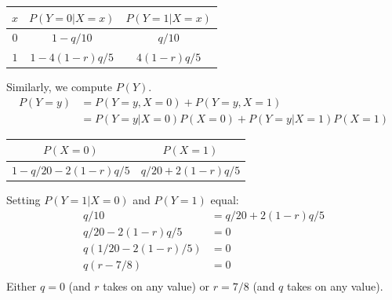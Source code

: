 \documentclass{article}
\begin{document}
\begin{center}
\begin{tabular}{|c|c|c|}
    \hline
    $x$ & $P(Y = 0 | X = x)$ & $P(Y = 1 | X = x)$ \\
    \hline
    $0$ & $1 - q/10$ & $q/10$ \\
    \hline
    $1$ & $1 - 4(1 - r)q/5$ & $4(1 - r)q/5$ \\
    \hline
\end{tabular}
\end{center}
Similarly, we compute $P(Y)$.
\begin{align*}
    P(Y = y) & = P(Y = y, X = 0) + P(Y = y, X = 1) \\
    & = P(Y = y | X = 0)P(X = 0) + P(Y = y | X = 1)P(X = 1)
\end{align*}
\begin{center}
\begin{tabular}{|c|c|}
    \hline
    $P(X = 0)$ & $P(X = 1)$ \\
    \hline
    $1 - q/20 - 2(1 - r)q/5$ & $q/20 + 2(1 - r)q/5$ \\
    \hline
\end{tabular}
\end{center}
Setting $P(Y = 1|X = 0)$ and $P(Y = 1)$ equal:
\begin{align*}
    q/10 & = q/20 + 2(1 - r)q/5 \\
    q/20 - 2(1 - r)q/5 & = 0 \\
    q(1/20 - 2(1 - r)/5) & = 0 \\
    q(r - 7/8) & = 0 \\
\end{align*}
Either $q = 0$ (and $r$ takes on any value) or $r = 7/8$ (and $q$ takes on any value).
\end{document}
